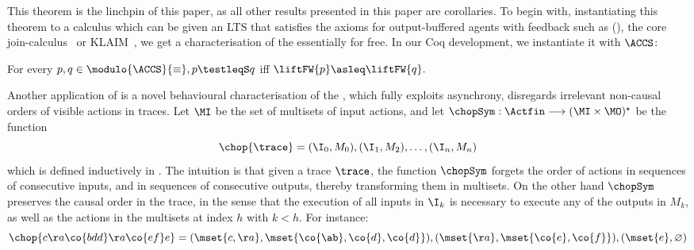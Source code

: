 \noindent
This theorem is the linchpin of this paper, as all other results presented in
this paper are corollaries.
%
To begin with, instantiating this theorem to a calculus which can be given an
LTS that satisfies the axioms for output-buffered agents with feedback
such as \ACCS (), the core join-calculus~\cite{join-calculus}
or KLAIM~\cite{klaim}, we get a characterisation of the \mustpreorder essentially
for free. In our Coq development, we instantiate it with $\ACCS$:
\begin{corollary}
  \label{cor:characterisation-for-aCCS}
For every $\serverA, \serverB \in \modulo{\ACCS}{\equiv}, \serverA \testleqS \serverB$ iff $\liftFW{\serverA} \asleq
\liftFW{\serverB}.$
\end{corollary}

\noindent
Another application of  is a novel
behavioural characterisation of the \mustpreorder, which fully exploits
asynchrony, \ie disregards irrelevant non-causal orders of visible
actions in traces.
%
Let $\MI$ be the set of multisets of input actions, and let $\chopSym : \Actfin \longrightarrow ( \MI \times \MO )^\star$ %
be the function %
$$
\chop{ \trace } = (\I_0, M_0),( \I_1, M_2), \ldots , (\I_n,M_n)
$$
which is defined inductively in .  The intuition is
that given a trace $\trace$, the function $\chopSym$ forgets the order
of actions in sequences of consecutive inputs, and in sequences of
consecutive outputs, thereby transforming them in multisets. On the
other hand $\chopSym$ preserves the causal order in the trace, in the
sense that the execution of all inputs in $\I_k$ is necessary to execute any of the outputs in $M_k$,
as well as the actions in the multisets at index $h$ with $k < h$.
For instance:
$$
\chop{ c\aa\co{bdd}\aa\co{ef}e} =
(\mset{c, \aa}, \mset{\co{\ab},\co{d},\co{d}}),
(\mset{\aa}, \mset{\co{e},\co{f}}),
(\mset{e},\varnothing)
$$

